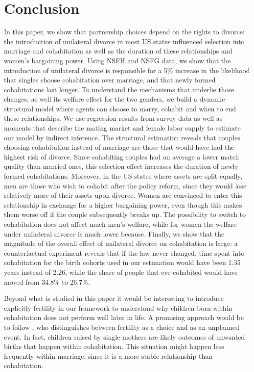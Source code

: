 \documentclass[12pt]{article}
\numberwithin{table}{section}
\begin{document}
\section{Conclusion}
In this paper, we show that partnership choices depend on the rights to divorce: the introduction of unilateral divorce in most US states influenced selection into marriage and cohabitation as well as the duration of these relationships and women's bargaining power. Using NSFH and NSFG data, we show that the introduction of unilateral divorce is responsible for a 5\% increase in the likelihood that singles choose cohabitation over marriage, and that newly formed cohabitations last longer. To understand the mechanisms that underlie those changes, as well its welfare effect for the two genders, we build a dynamic structural model where agents can choose to marry, cohabit and when to end these relationships. We use regression results from survey data as well as moments that describe the mating market and female labor supply to estimate our model by indirect inference. The structural estimation reveals that couples choosing cohabitation instead of marriage are those that would have had the highest risk of divorce. Since cohabiting couples had on average a lower match quality than married ones, this selection effect increases the duration of newly formed cohabitations. Moreover, in the US states where assets are split equally, men are those who wish to cohabit after the policy reform, since they would lose relatively more of their assets upon divorce. Women are convinced to enter this relationship in exchange for a higher bargaining power, even though this makes them worse off if the couple subsequently breaks up. The possibility to switch to cohabitation does not affect much men's welfare, while for women the welfare under unilateral divorce is much lower because. Finally, we show that the magnitude of the overall effect of unilateral divorce on cohabitation is large: a counterfactual experiment reveals that if the law never changed, time spent into cohabitation for the birth cohorts used in our estimation would have been 1.35 years instead of 2.26, while the share of people that eve cohabited would have moved from 34.8\% to 26.7\%.

Beyond what is studied in this paper it would be interesting to introduce explicitly fertility in our framework to understand why children born within cohabitation does not perform well later in life. A promising approach would be to follow \cite{kozlov2020}, who distinguishes between fertility as a choice and as an unplanned event. In fact, children raised by single mothers are likely outcomes of unwanted births that happen within cohabitation. This situation might happen less frequently within marriage, since it is a more stable relationship than cohabitation.
\end{document}
